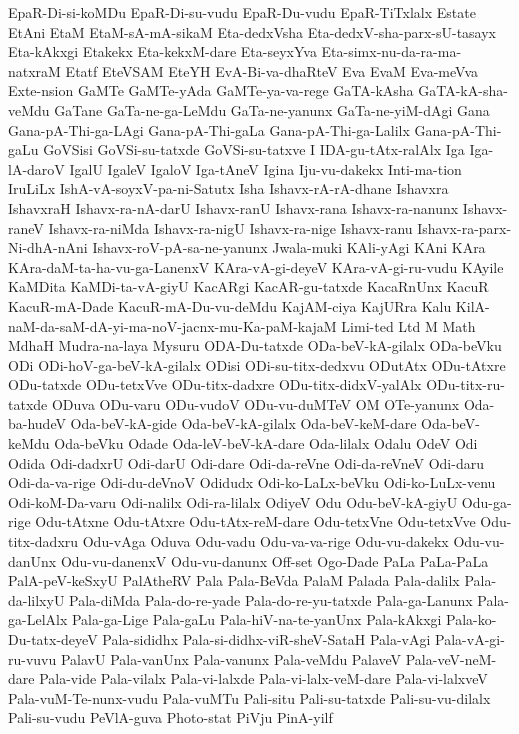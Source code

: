 {EpaR-Di-si-koMDu
EpaR-Di-su-vudu
EpaR-Du-vudu
EpaR-TiTxlalx
Estate
EtAni
EtaM
EtaM-sA-mA-sikaM
Eta-dedxVsha
Eta-dedxV-sha-parx-sU-tasayx
Eta-kAkxgi
Etakekx
Eta-kekxM-dare
Eta-seyxYva
Eta-simx-nu-da-ra-ma-natxraM
Etatf
EteVSAM
EteYH
EvA-Bi-va-dhaRteV
Eva
EvaM
Eva-meVva
Exte-nsion
GaMTe
GaMTe-yAda
GaMTe-ya-va-rege
GaTA-kAsha
GaTA-kA-sha-veMdu
GaTane
GaTa-ne-ga-LeMdu
GaTa-ne-yanunx
GaTa-ne-yiM-dAgi
Gana
Gana-pA-Thi-ga-LAgi
Gana-pA-Thi-gaLa
Gana-pA-Thi-ga-Lalilx
Gana-pA-Thi-gaLu
GoVSisi
GoVSi-su-tatxde
GoVSi-su-tatxve
I
IDA-gu-tAtx-ralAlx
Iga
Iga-lA-daroV
IgalU
IgaleV
IgaloV
Iga-tAneV
Igina
Iju-vu-dakekx
Inti-ma-tion
IruLiLx
IshA-vA-soyxV-pa-ni-Satutx
Isha
Ishavx-rA-rA-dhane
Ishavxra
IshavxraH
Ishavx-ra-nA-darU
Ishavx-ranU
Ishavx-rana
Ishavx-ra-nanunx
Ishavx-raneV
Ishavx-ra-niMda
Ishavx-ra-nigU
Ishavx-ra-nige
Ishavx-ranu
Ishavx-ra-parx-Ni-dhA-nAni
Ishavx-roV-pA-sa-ne-yanunx
Jwala-muki
KAli-yAgi
KAni
KAra
KAra-daM-ta-ha-vu-ga-LanenxV
KAra-vA-gi-deyeV
KAra-vA-gi-ru-vudu
KAyile
KaMDita
KaMDi-ta-vA-giyU
KacARgi
KacAR-gu-tatxde
KacaRnUnx
KacuR
KacuR-mA-Dade
KacuR-mA-Du-vu-deMdu
KajAM-ciya
KajURra
Kalu
KilA-naM-da-saM-dA-yi-ma-noV-jacnx-mu-Ka-paM-kajaM
Limi-ted
Ltd
M
Math
MdhaH
Mudra-na-laya
Mysuru
ODA-Du-tatxde
ODa-beV-kA-gilalx
ODa-beVku
ODi
ODi-hoV-ga-beV-kA-gilalx
ODisi
ODi-su-titx-dedxvu
ODutAtx
ODu-tAtxre
ODu-tatxde
ODu-tetxVve
ODu-titx-dadxre
ODu-titx-didxV-yalAlx
ODu-titx-ru-tatxde
ODuva
ODu-varu
ODu-vudoV
ODu-vu-duMTeV
OM
OTe-yanunx
Oda-ba-hudeV
Oda-beV-kA-gide
Oda-beV-kA-gilalx
Oda-beV-keM-dare
Oda-beV-keMdu
Oda-beVku
Odade
Oda-leV-beV-kA-dare
Oda-lilalx
Odalu
OdeV
Odi
Odida
Odi-dadxrU
Odi-darU
Odi-dare
Odi-da-reVne
Odi-da-reVneV
Odi-daru
Odi-da-va-rige
Odi-du-deVnoV
Odidudx
Odi-ko-LaLx-beVku
Odi-ko-LuLx-venu
Odi-koM-Da-varu
Odi-nalilx
Odi-ra-lilalx
OdiyeV
Odu
Odu-beV-kA-giyU
Odu-ga-rige
Odu-tAtxne
Odu-tAtxre
Odu-tAtx-reM-dare
Odu-tetxVne
Odu-tetxVve
Odu-titx-dadxru
Odu-vAga
Oduva
Odu-vadu
Odu-va-va-rige
Odu-vu-dakekx
Odu-vu-danUnx
Odu-vu-danenxV
Odu-vu-danunx
Off-set
Ogo-Dade
PaLa
PaLa-PaLa
PalA-peV-keSxyU
PalAtheRV
Pala
Pala-BeVda
PalaM
Palada
Pala-dalilx
Pala-da-lilxyU
Pala-diMda
Pala-do-re-yade
Pala-do-re-yu-tatxde
Pala-ga-Lanunx
Pala-ga-LelAlx
Pala-ga-Lige
Pala-gaLu
Pala-hiV-na-te-yanUnx
Pala-kAkxgi
Pala-ko-Du-tatx-deyeV
Pala-sididhx
Pala-si-didhx-viR-sheV-SataH
Pala-vAgi
Pala-vA-gi-ru-vuvu
PalavU
Pala-vanUnx
Pala-vanunx
Pala-veMdu
PalaveV
Pala-veV-neM-dare
Pala-vide
Pala-vilalx
Pala-vi-lalxde
Pala-vi-lalx-veM-dare
Pala-vi-lalxveV
Pala-vuM-Te-nunx-vudu
Pala-vuMTu
Pali-situ
Pali-su-tatxde
Pali-su-vu-dilalx
Pali-su-vudu
PeVlA-guva
Photo-stat
PiVju
PinA-yilf
}

